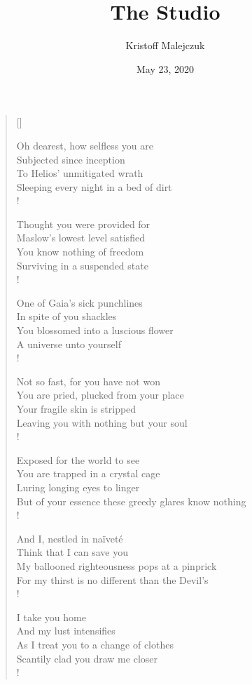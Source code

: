 \documentclass[11pt, oneside]{article}
\title{The Studio}
\author{Kristoff Malejczuk}
\date{May 23, 2020}                                                        %
\begin{document}
\settowidth{\versewidth}{You are pried, plucked from your place}

\begin{verse}[\versewidth]

Oh dearest, how selfless you are \\
Subjected since inception \\
To Helios' unmitigated wrath \\
Sleeping every night in a bed of dirt \\!

Thought you were provided for \\
Maslow's lowest level satisfied \\
You know nothing of freedom \\
Surviving in a suspended state \\!

One of Gaia's sick punchlines \\
In spite of you shackles \\
You blossomed into a luscious flower \\
A universe unto yourself \\!

Not so fast, for you have not won \\
You are pried, plucked from your place \\
Your fragile skin is stripped \\
Leaving you with nothing but your soul \\!

Exposed for the world to see \\
You are trapped in a crystal cage \\
Luring longing eyes to linger \\
But of your essence these greedy glares know nothing \\!

And I, nestled in naïveté \\
Think that I can save you \\
My ballooned righteousness pops at a pinprick \\
For my thirst is no different than the Devil's \\!

I take you home \\
And my lust intensifies \\
As I treat you to a change of clothes \\
Scantily clad you draw me closer \\!


\end{verse}
\end{document}
